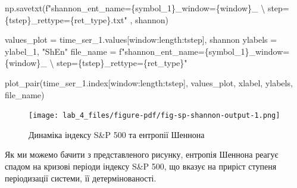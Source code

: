 \documentclass[
  letterpaper,
]{report}
\newenvironment{Shaded}{\begin{snugshade}}{\end{snugshade}}
\newcommand{\CharTok}[1]{\textcolor[rgb]{0.13,0.47,0.30}{#1}}
\newcommand{\NormalTok}[1]{\textcolor[rgb]{0.00,0.23,0.31}{#1}}
\newcommand{\OperatorTok}[1]{\textcolor[rgb]{0.37,0.37,0.37}{#1}}
\newcommand{\SpecialCharTok}[1]{\textcolor[rgb]{0.37,0.37,0.37}{#1}}
\newcommand{\SpecialStringTok}[1]{\textcolor[rgb]{0.13,0.47,0.30}{#1}}
\newcommand{\StringTok}[1]{\textcolor[rgb]{0.13,0.47,0.30}{#1}}
\begin{document}
\begin{Shaded}
\begin{Highlighting}[]
\NormalTok{np.savetxt(}\SpecialStringTok{f"shannon\_ent\_name=}\SpecialCharTok{\{}\NormalTok{symbol\_1}\SpecialCharTok{\}}\SpecialStringTok{\_window=}\SpecialCharTok{\{}\NormalTok{window}\SpecialCharTok{\}}\SpecialStringTok{\_ }\CharTok{\textbackslash{}}
\SpecialStringTok{    step=}\SpecialCharTok{\{}\NormalTok{tstep}\SpecialCharTok{\}}\SpecialStringTok{\_rettype=}\SpecialCharTok{\{}\NormalTok{ret\_type}\SpecialCharTok{\}}\SpecialStringTok{.txt"}\NormalTok{ , shannon)}
\end{Highlighting}
\end{Shaded}

\begin{Shaded}
\begin{Highlighting}[]
\NormalTok{values\_plot }\OperatorTok{=}\NormalTok{ time\_ser\_1.values[window:length:tstep], shannon}
\NormalTok{ylabels }\OperatorTok{=}\NormalTok{ ylabel\_1, }\StringTok{"ShEn"}
\NormalTok{file\_name }\OperatorTok{=} \SpecialStringTok{f"shannon\_ent\_name=}\SpecialCharTok{\{}\NormalTok{symbol\_1}\SpecialCharTok{\}}\SpecialStringTok{\_window=}\SpecialCharTok{\{}\NormalTok{window}\SpecialCharTok{\}}\SpecialStringTok{\_ }\CharTok{\textbackslash{}}
\SpecialStringTok{    step=}\SpecialCharTok{\{}\NormalTok{tstep}\SpecialCharTok{\}}\SpecialStringTok{\_rettype=}\SpecialCharTok{\{}\NormalTok{ret\_type}\SpecialCharTok{\}}\SpecialStringTok{"}
\end{Highlighting}
\end{Shaded}

\begin{Shaded}
\begin{Highlighting}[]
\NormalTok{plot\_pair(time\_ser\_1.index[window:length:tstep], }
\NormalTok{            values\_plot, xlabel, ylabels, file\_name)}
\end{Highlighting}
\end{Shaded}

\begin{figure}[H]

{\centering \texttt{[image: lab\_4\_files/figure-pdf/fig-sp-shannon-output-1.png]}

}

\caption{\label{fig-sp-shannon}Динаміка індексу S\&P 500 та ентропії
Шеннона}

\end{figure}

Як ми можемо бачити з представленого рисунку, ентропія Шеннона реагує
спадом на кризові періоди індексу S\&P 500, що вказує на приріст ступеня
періодизації системи, її детермінованості.
\end{document}
